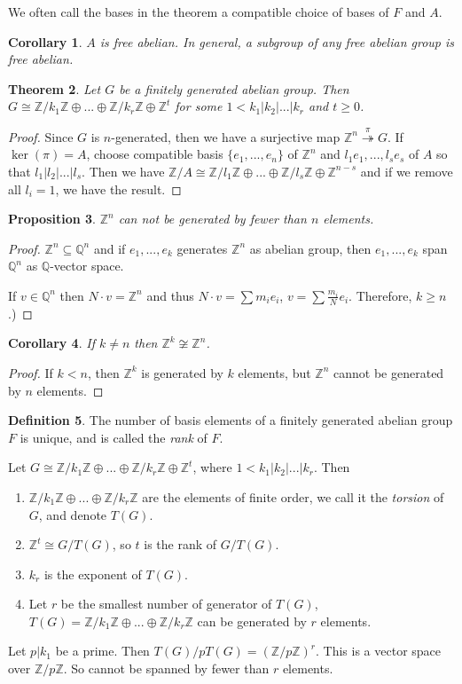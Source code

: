 \documentclass{amsart}
\newtheorem{thm}{Theorem}[section]
\newtheorem{prop}[thm]{Proposition}
\newtheorem{cor}[thm]{Corollary}
\theoremstyle{definition}
\newtheorem{definition}[thm]{Definition}
\newcommand{\Q}{\mathbb Q}
\newcommand{\Z}{\mathbb Z}
\begin{document}
We often call the bases in the theorem a compatible choice of bases of $F$ and $A$.
\begin{cor}
	$A$ is free abelian. In general, a subgroup of any free abelian group is free abelian.
\end{cor}
\begin{thm}
Let $G$ be a finitely generated abelian group. Then $G \cong \Z/k_1\Z \oplus...\oplus \Z/k_r\Z\oplus \Z^t$ for some $1<k_1|k_2|...|k_r$ and $t\geq 0$.	
\end{thm}
\begin{proof}
Since $G$ is $n$-generated, then we have a surjective map $\Z^n\overset{\pi}\twoheadrightarrow G$. If $\ker(\pi)=A$, choose compatible basis $\{e_1,...,e_n\}$ of $\Z^n$ and $l_1e_1,...,l_se_s$ of $A$ so that $l_1|l_2|...|l_s$. Then we have $\Z/A\cong\Z/l_1\Z\oplus ...\oplus \Z/l_s\Z\oplus \Z^{n-s}$ and if we remove all $l_i=1$, we have the result.
\end{proof}
\begin{prop}
$\Z^n$ can not be generated by fewer than $n$ elements.	
\end{prop}
\begin{proof}
$\Z^n\subseteq \Q^n$ and if $e_1,...,e_k$ generates $\Z^n$ as abelian group, then $e_1,...,e_k$ span $\Q^n$ as $\Q$-vector space.

If $v\in\Q^n$ then $N\cdot v=\Z^n$ and thus $N\cdot v=\sum m_ie_i$, $v=\sum \frac{m_i}{N}e_i$. Therefore, $k\geq n$.)
\end{proof}
\begin{cor}
If $k\not=n$	then $\Z^k\not\cong\Z^n$.
\end{cor}
\begin{proof}
If $k<n$, then $\Z^k$ is generated by $k$ elements, but $\Z^n$ cannot be generated by $n$ elements.
\end{proof}
\begin{definition}
	The number of basis elements of a finitely generated abelian group $F$ is unique, and is called the \emph{rank} of $F$.
\end{definition}
Let $G\cong \Z/k_1\Z\oplus ...\oplus \Z/k_r\Z\oplus \Z^t$, where $1<k_1|k_2|...|k_r$. Then
\begin{enumerate}
	\item $\Z/k_1\Z\oplus ...\oplus \Z/k_r\Z$ are the elements of finite order, we call it the \emph{torsion} of $G$, and denote $T(G)$.
	\item $\Z^t\cong G/T(G)$, so $t$ is the rank of $G/T(G)$.
	\item $k_r$ is the exponent of $T(G)$.
	\item Let $r$ be the smallest number of generator of $T(G)$, $T(G)=\Z/k_1\Z\oplus...\oplus \Z/k_r\Z$ can be generated by $r$ elements.
\end{enumerate}
Let $p|k_1$ be a prime. Then $T(G)/pT(G)=(\Z/p\Z)^r$. This is a vector space over $\Z/p\Z$. So cannot be spanned by fewer than $r$ elements.
\end{document}
